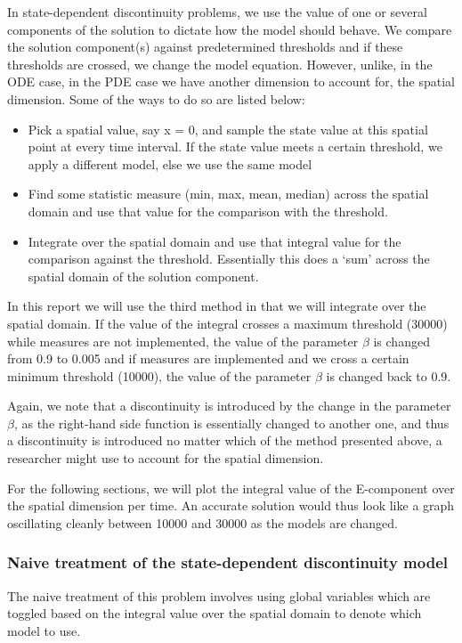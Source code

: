 \documentclass{article}
\begin{document}
In state-dependent discontinuity problems, we use the value of one or several components of the solution to dictate how the model should behave. We compare the solution component(s) against predetermined thresholds and if these thresholds are crossed, we change the model equation. However, unlike, in the ODE case, in the PDE case we have another dimension to account for, the spatial dimension. Some of the ways to do so are listed below:
\begin{itemize}
\item Pick a spatial value, say x = 0, and sample the state value at this spatial point at every time interval. If the state value meets a certain threshold, we apply a different model, else we use the same model

\item Find some statistic measure (min, max, mean, median) across the spatial domain and use that value for the comparison with the threshold.

\item Integrate over the spatial domain and use that integral value for the comparison against the threshold. Essentially this does a `sum' across the spatial domain of the solution component.
\end{itemize}

In this report we will use the third method in that we will integrate over the spatial domain. If the value of the integral crosses a maximum threshold (30000) while measures are not implemented, the value of the parameter $\beta$ is changed from 0.9 to 0.005 and if measures are implemented and we cross a certain minimum threshold (10000), the value of the parameter $\beta$ is changed back to 0.9. 

Again, we note that a discontinuity is introduced by the change in the parameter $\beta$, as the right-hand side function is essentially changed to another one, and thus a discontinuity is introduced no matter which of the method presented above, a researcher might use to account for the spatial dimension.
 
For the following sections, we will plot the integral value of the E-component over the spatial dimension per time. An accurate solution would thus look like a graph oscillating cleanly between 10000 and 30000 as the models are changed.
\subsubsection{Naive treatment of the state-dependent discontinuity model}
\label{subsubsection:pde_state_naive}
The naive treatment of this problem involves using global variables which are toggled based on the integral value over the spatial domain to denote which model to use. 
\end{document}
